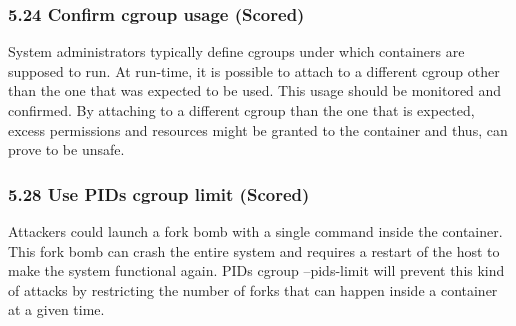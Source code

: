 \subsubsection*{5.24 Confirm cgroup usage (Scored)} System administrators typically define cgroups under which containers are supposed to
run. 
At run-time, it is possible to attach to a different cgroup other than the one that was
expected to be used. This usage should be monitored and confirmed. By attaching to a
different cgroup than the one that is expected, excess permissions and resources might be
granted to the container and thus, can prove to be unsafe.

\subsubsection*{5.28 Use PIDs cgroup limit (Scored)} Attackers could launch a fork bomb with a single command inside the container. This fork
bomb can crash the entire system and requires a restart of the host to make the system
functional again. PIDs cgroup --pids-limit will prevent this kind of attacks by restricting
the number of forks that can happen inside a container at a given time.


